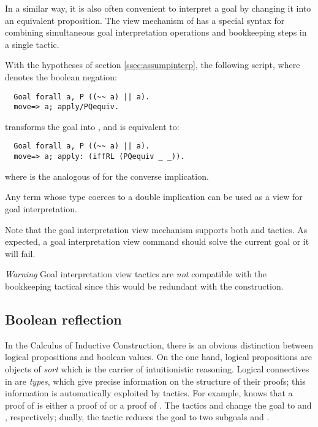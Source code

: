 In a similar way, it is also often convenient to interpret a goal by changing
it into an equivalent proposition. The view mechanism of \ssr{} has a
special syntax  for combining simultaneous goal
interpretation operations and
bookkeeping steps in a single tactic.

With the hypotheses of section \ref{ssec:assumpinterp}, the following
script, where \C{\~\~} denotes the boolean negation:
\begin{lstlisting}
  Goal forall a, P ((~~ a) || a).
  move=> a; apply/PQequiv.
\end{lstlisting}
transforms the goal into , and is equivalent to:
\begin{lstlisting}
  Goal forall a, P ((~~ a) || a).
  move=> a; apply: (iffRL (PQequiv _ _)).
\end{lstlisting}
where  is the analogous of  for the converse
implication.

Any \ssr{} term whose type coerces to a double implication can be used
as a view for goal interpretation.

Note that the goal interpretation view mechanism supports both
 and  tactics. As expected, a goal interpretation
view command  should solve the current goal or it will
fail.


\emph{Warning} Goal interpretation view tactics are \emph{not} compatible
with the bookkeeping tactical \C{=>} since this would be redundant with
the  construction.

\subsection{Boolean reflection}\label{ssec:boolrefl}
In the Calculus of Inductive Construction, there is
an obvious distinction between logical propositions and boolean values.
On the one hand, logical propositions are objects
of \emph{sort}  which is the carrier of intuitionistic
reasoning. Logical connectives in  are \emph{types}, which give precise
information on the structure of their proofs; this information is
automatically exploited by \Coq{} tactics. For example, \Coq{} knows that a
proof of  is either a proof of  or a proof of .
The tactics  and  change the goal 
to  and , respectively; dually, the tactic  reduces the goal
 to two subgoals  and .

